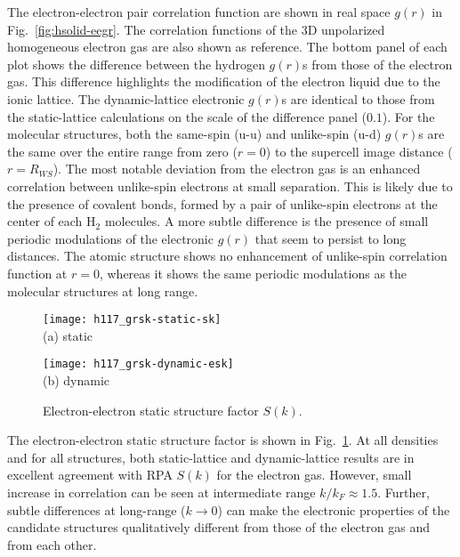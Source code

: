The electron-electron pair correlation function are shown in real space $g(r)$ in Fig.~\ref{fig:hsolid-eegr}.
The correlation functions of the 3D unpolarized homogeneous electron gas are also shown as reference.
The bottom panel of each plot shows the difference between the hydrogen $g(r)$s from those of the electron gas.
This difference highlights the modification of the electron liquid due to the ionic lattice.
The dynamic-lattice electronic $g(r)$s are identical to those from the static-lattice calculations on the scale of the difference panel ($0.1$).
For the molecular structures, both the same-spin (u-u) and unlike-spin (u-d) $g(r)$s are the same over the entire range from zero ($r=0$) to the supercell image distance ($r=R_{WS}$).
The most notable deviation from the electron gas is an enhanced correlation between unlike-spin electrons at small separation.
This is likely due to the presence of covalent bonds, formed by a pair of unlike-spin electrons at the center of each H$_2$ molecules.
A more subtle difference is the presence of small periodic modulations of the electronic $g(r)$ that seem to persist to long distances.
The atomic structure shows no enhancement of unlike-spin correlation function at $r=0$, whereas it shows the same periodic modulations as the molecular structures at long range.

\begin{figure}[h]
	\centering
	\begin{minipage}{0.49\textwidth}
		\centering
		\texttt{[image: h117\_grsk-static-sk]}\\
		(a) static
	\end{minipage}
	\begin{minipage}{0.49\textwidth}
		\centering
		\texttt{[image: h117\_grsk-dynamic-esk]}\\
		(b) dynamic
	\end{minipage}
	\caption{Electron-electron static structure factor $S(k)$.}
	\label{fig:hsolid-esk}
\end{figure}

The electron-electron static structure factor is shown in Fig.~\ref{fig:hsolid-esk}.
At all densities and for all structures, both static-lattice and dynamic-lattice results are in excellent agreement with RPA $S(k)$ for the electron gas.
However, small increase in correlation can be seen at intermediate range $k/k_F\approx 1.5$.
Further, subtle differences at long-range ($k\rightarrow0$) can make the electronic properties of the candidate structures qualitatively different from those of the electron gas and from each other.

